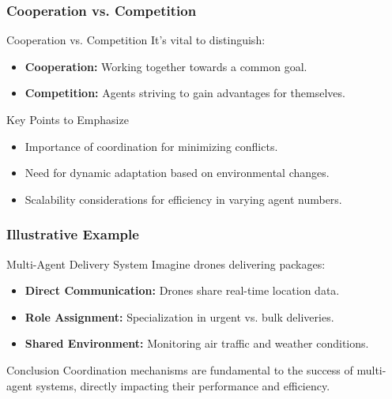 \documentclass[aspectratio=169]{beamer}
\begin{document}
\begin{frame}[fragile]
    \frametitle{Cooperation vs. Competition}
    \begin{block}{Cooperation vs. Competition}
        It's vital to distinguish:
        \begin{itemize}
            \item \textbf{Cooperation:} Working together towards a common goal.
            \item \textbf{Competition:} Agents striving to gain advantages for themselves.
        \end{itemize}
    \end{block}
    
    \begin{block}{Key Points to Emphasize}
        \begin{itemize}
            \item Importance of coordination for minimizing conflicts.
            \item Need for dynamic adaptation based on environmental changes.
            \item Scalability considerations for efficiency in varying agent numbers.
        \end{itemize}
    \end{block}
\end{frame}

\begin{frame}[fragile]
    \frametitle{Illustrative Example}
    \begin{block}{Multi-Agent Delivery System}
        Imagine drones delivering packages:
        \begin{itemize}
            \item \textbf{Direct Communication:} Drones share real-time location data.
            \item \textbf{Role Assignment:} Specialization in urgent vs. bulk deliveries.
            \item \textbf{Shared Environment:} Monitoring air traffic and weather conditions.
        \end{itemize}
    \end{block}
    
    \begin{block}{Conclusion}
        Coordination mechanisms are fundamental to the success of multi-agent systems, directly impacting their performance and efficiency.
    \end{block}
\end{frame}
\end{document}
